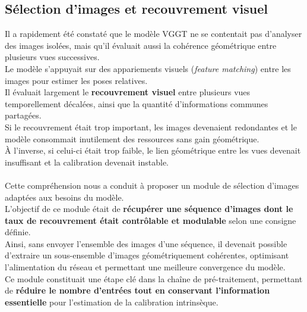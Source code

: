 \documentclass[12pt,a4paper,oneside]{report}
\begin{document}
\newpage

\subsection{Sélection d'images et recouvrement visuel}

\hspace*{.5cm} Il a rapidement été constaté que le modèle VGGT ne se contentait pas d'analyser des images isolées, mais qu'il évaluait aussi la cohérence géométrique entre plusieurs vues successives.\\
\hspace*{.5cm}Le modèle s'appuyait sur des appariements visuels (\textit{feature matching}) entre les images pour estimer les poses relatives.\\
\hspace*{1cm}Il évaluait largement le \textbf{recouvrement visuel} entre plusieurs vues temporellement décalées, ainsi que la quantité d'informations communes partagées.\\

\hspace*{1cm}Si le recouvrement était trop important, les images devenaient redondantes et le modèle consommait inutilement des ressources sans gain géométrique. \\
\hspace*{.3cm} À l'inverse, si celui-ci était trop faible, le lien géométrique entre les vues devenait insuffisant et la calibration devenait instable.

\paragraph{} 
Cette compréhension nous a conduit à proposer un module de sélection d'images adaptées aux besoins du modèle.\\

\hspace{1cm}L'objectif de ce module était de \textbf{récupérer une séquence d'images dont le taux de recouvrement était contrôlable et modulable} selon une consigne définie. \\
\hspace*{.5cm} Ainsi, sans envoyer l'ensemble des images d'une séquence, il devenait possible d'extraire un sous-ensemble d'images géométriquement cohérentes, optimisant l'alimentation du réseau et permettant une meilleure convergence du modèle.\\

\hspace{1cm}Ce module constituait une étape clé dans la chaîne de pré-traitement, permettant de \textbf{réduire le nombre d'entrées tout en conservant l'information essentielle} pour l'estimation de la calibration intrinsèque.
\end{document}
